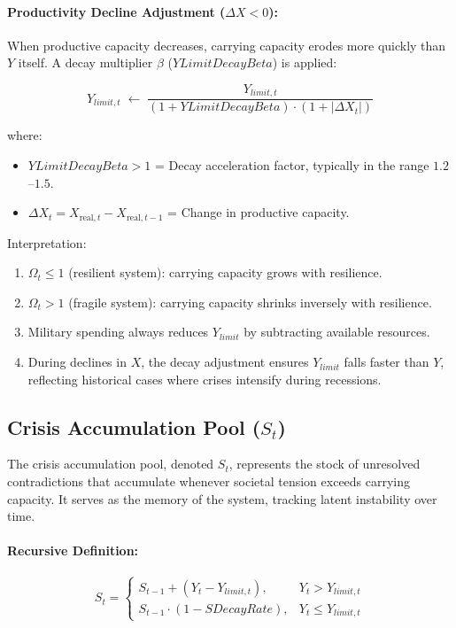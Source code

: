 \documentclass[12pt,a4paper]{article}
\begin{document}
\paragraph{Productivity Decline Adjustment ($\Delta X < 0$):}
When productive capacity decreases, carrying capacity erodes more quickly 
than $Y$ itself. A decay multiplier $\beta$ ($YLimitDecayBeta$) is applied:

\begin{equation}
Y_{limit,t} \; \gets \; \frac{Y_{limit,t}}{ (1 + YLimitDecayBeta) \cdot (1 + |\Delta X_t|) }
\end{equation}

\noindent where:
\begin{itemize}
    \item $YLimitDecayBeta > 1$ = Decay acceleration factor, typically in the range $1.2$–$1.5$.
    \item $\Delta X_t = X_{\mathrm{real},t} - X_{\mathrm{real},t-1}$ = Change in productive capacity.
\end{itemize}

\noindent Interpretation:
\begin{enumerate}
    \item $\Omega_t \leq 1$ (resilient system): carrying capacity grows with resilience.  
    \item $\Omega_t > 1$ (fragile system): carrying capacity shrinks inversely with resilience.  
    \item Military spending always reduces $Y_{limit}$ by subtracting available resources.  
    \item During declines in $X$, the decay adjustment ensures $Y_{limit}$ falls faster than $Y$, 
          reflecting historical cases where crises intensify during recessions.  
\end{enumerate}
\subsection{Crisis Accumulation Pool (\texorpdfstring{$S_t$}{S\_t})}

The crisis accumulation pool, denoted $S_t$, represents the stock of unresolved 
contradictions that accumulate whenever societal tension exceeds carrying capacity. 
It serves as the memory of the system, tracking latent instability over time.

\paragraph{Recursive Definition:}
\begin{equation}
S_t =
\begin{cases}
S_{t-1} + (Y_t - Y_{limit,t}), & Y_t > Y_{limit,t} \\
S_{t-1} \cdot (1 - SDecayRate), & Y_t \leq Y_{limit,t}
\end{cases}
\end{equation}
\end{document}
